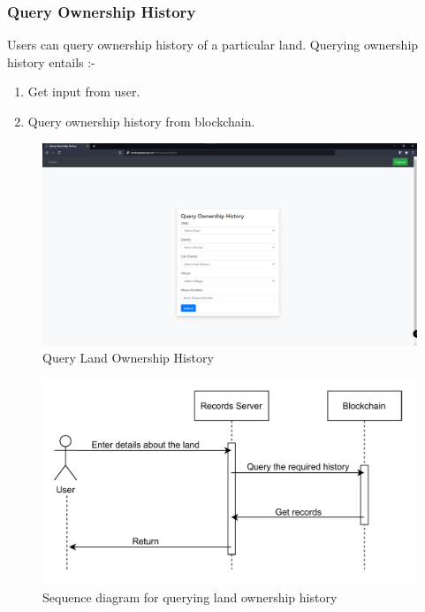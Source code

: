 \documentclass{article}
\begin{document}
        \subsubsection{Query Ownership History}
            Users can query ownership history of a particular land.
            Querying ownership history entails :-
            \begin{enumerate}
                \item Get input from user.
                \item Query ownership history from blockchain.
            \end{enumerate}
            
            \begin{figure}[htbp]
                \includegraphics[scale=0.25]{records_query_history}
                \centering
                \caption{Query Land Ownership History}
            \end{figure}
            
            \begin{figure}[htbp]
                \includegraphics[scale=0.25]{records_seq_query_history}
                \centering
                \caption{Sequence diagram for querying land ownership history}
            \end{figure}
\end{document}
